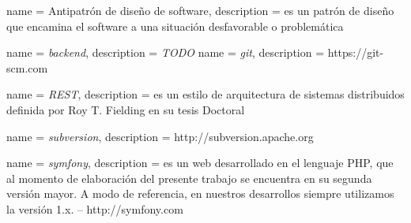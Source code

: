  {
  name = {Antipatrón de diseño de software},
  description = {es un patrón de diseño que encamina el software a una situación desfavorable o problemática}
}

 {
  name = \textit{backend},
  description = {\textit{TODO}}
}
 {
  name = \textit{git},
  description = {https://git-scm.com}
}

 {
  name = \textit{REST},
  description = {es un estilo de arquitectura de sistemas distribuidos definida por Roy T. Fielding en su tesis Doctoral}
}

 {
  name = \textit{subversion},
  description = {http://subversion.apache.org}
}

 {
  name = \textit{symfony},
  description = {es un  web desarrollado en el lenguaje PHP, que al momento de elaboración del presente trabajo se encuentra en su segunda versión mayor. A modo de referencia, en nuestros desarrollos siempre utilizamos la versión 1.x. – http://symfony.com}
}

